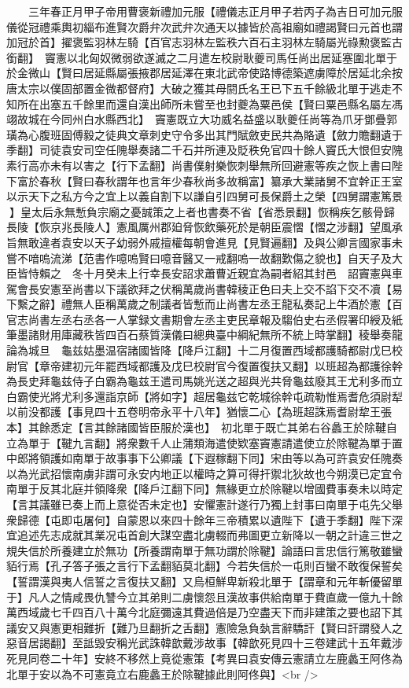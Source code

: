 　　三年春正月甲子帝用曹褒新禮加元服【禮儀志正月甲子若丙子為吉日可加元服儀從冠禮乘輿初緇布進賢次爵弁次武弁次通天以據皆於高祖廟如禮謁賢曰元首也謂加冠於首】擢褒監羽林左騎【百官志羽林左監秩六百石主羽林左騎屬光祿勲褒監古銜翻】　竇憲以北匈奴微弱欲遂滅之二月遣左校尉耿夔司馬任尚出居延塞圍北單于於金微山【賢曰居延縣屬張掖郡居延澤在東北武帝使路博德築遮虜障於居延北余按唐太宗以僕固部置金微都督府】大破之獲其母閼氏名王已下五千餘級北單于逃走不知所在出塞五千餘里而還自漢出師所未嘗至也封夔為粟邑侯【賢曰粟邑縣名屬左馮翊故城在今同州白水縣西北】　竇憲既立大功威名益盛以耿夔任尚等為爪牙鄧疊郭璜為心腹班固傅毅之徒典文章刺史守令多出其門賦斂吏民共為賂遺【斂力贍翻遺于季翻】司徒袁安司空任隗舉奏諸二千石并所連及貶秩免官四十餘人竇氏大恨但安隗素行高亦未有以害之【行下孟翻】尚書僕射樂恢刺舉無所回避憲等疾之恢上書曰陛下富於春秋【賢曰春秋謂年也言年少春秋尚多故稱富】纂承大業諸舅不宜幹正王室以示天下之私方今之宜上以義自割下以謙自引四舅可長保爵土之榮【四舅謂憲篤景】皇太后永無慙負宗廟之憂誠策之上者也書奏不省【省悉景翻】恢稱疾乞骸骨歸長陵【恢京兆長陵人】憲風厲州郡廹脅恢飲藥死於是朝臣震慴【慴之涉翻】望風承旨無敢違者袁安以天子幼弱外戚擅權每朝會進見【見賢遍翻】及與公卿言國家事未嘗不喑嗚流涕【范書作噫嗚賢曰噫音醫又一戒翻嗚一故翻歎傷之貌也】自天子及大臣皆恃賴之　冬十月癸未上行幸長安詔求蕭曹近親宜為嗣者紹其封邑　詔竇憲與車駕會長安憲至尚書以下議欲拜之伏稱萬歲尚書韓稜正色曰夫上交不諂下交不凟【易下繫之辭】禮無人臣稱萬歲之制議者皆慙而止尚書左丞王龍私奏記上牛酒於憲【百官志尚書左丞右丞各一人掌録文書期會左丞主吏民章報及騶伯史右丞假署印綬及紙筆墨諸財用庫藏秩皆四百石蔡質漢儀曰總典臺中綱紀無所不統上時掌翻】稜舉奏龍論為城旦　龜兹姑墨温宿諸國皆降【降戶江翻】十二月復置西域都護騎都尉戊巳校尉官【章帝建初元年罷西域都護及戊巳校尉官今復置復扶又翻】以班超為都護徐幹為長史拜龜兹侍子白霸為龜兹王遣司馬姚光送之超與光共脅龜兹廢其王尤利多而立白霸使光將尤利多還詣京師【將如字】超居龜兹它乾城徐幹屯疏勒惟焉耆危須尉犁以前没都護【事見四十五卷明帝永平十八年】猶懷二心【為班超誅焉耆尉犂王張本】其餘悉定【言其餘諸國皆臣服於漢也】　初北單于既亡其弟右谷蠡王於除鞬自立為單于【鞬九言翻】將衆數千人止蒲類海遣使欵塞竇憲請遣使立於除鞬為單于置中郎將領護如南單于故事事下公卿議【下遐稼翻下同】宋由等以為可許袁安任隗奏以為光武招懷南虜非謂可永安内地正以權時之算可得扞禦北狄故也今朔漠已定宜令南單于反其北庭并領降衆【降戶江翻下同】無緣更立於除鞬以增國費事奏未以時定【言其議雖已奏上而上意從否未定也】安懼憲計遂行乃獨上封事曰南單于屯先父舉衆歸德【屯即屯屠何】自蒙恩以來四十餘年三帝積累以遺陛下【遺于季翻】陛下深宜追述先志成就其業况屯首創大謀空盡北虜輟而弗圖更立新降以一朝之計違三世之規失信於所養建立於無功【所養謂南單于無功謂於除鞬】論語曰言忠信行篤敬雖蠻貊行焉【孔子答子張之言行下孟翻貊莫北翻】今若失信於一屯則百蠻不敢復保誓矣【誓謂漢與夷人信誓之言復扶又翻】又烏桓鮮卑新殺北單于【謂章和元年斬優留單于】凡人之情咸畏仇讐今立其弟則二虜懷怨且漢故事供給南單于費直歲一億九十餘萬西域歲七千四百八十萬今北庭彌遠其費過倍是乃空盡天下而非建策之要也詔下其議安又與憲更相難折【難乃旦翻折之舌翻】憲險急負埶言辭驕訐【賢曰訐謂發人之惡音居謁翻】至詆毁安稱光武誅韓歆戴涉故事【韓歆死見四十三卷建武十五年戴涉死見同卷二十年】安終不移然上竟從憲策【考異曰袁安傳云憲請立左鹿蠡王阿佟為北單于安以為不可憲竟立右鹿蠡王於除鞬據此則阿佟與】<br />
